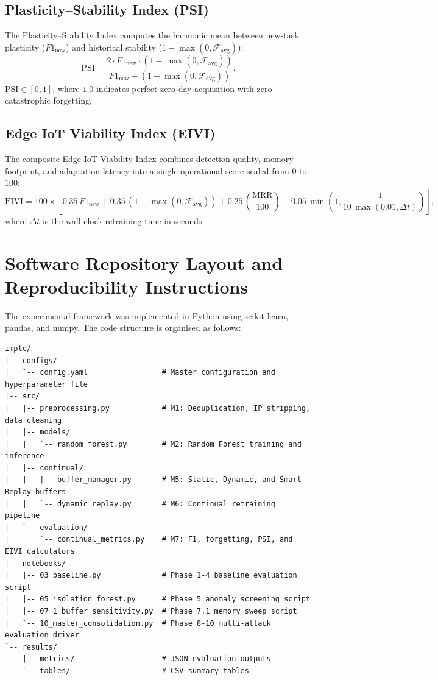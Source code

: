 \subsection{Plasticity--Stability Index (PSI)}
The Plasticity--Stability Index computes the harmonic mean between new-task plasticity ($F1_{\text{new}}$) and historical stability ($1 - \max(0, \mathcal{F}_{\text{avg}})$):
\begin{equation}
\text{PSI} = \frac{2 \cdot F1_{\text{new}} \cdot (1 - \max(0, \mathcal{F}_{\text{avg}}))}{F1_{\text{new}} + (1 - \max(0, \mathcal{F}_{\text{avg}}))}.
\end{equation}
$\text{PSI} \in [0, 1]$, where $1.0$ indicates perfect zero-day acquisition with zero catastrophic forgetting.

\subsection{Edge IoT Viability Index (EIVI)}
The composite Edge IoT Viability Index combines detection quality, memory footprint, and adaptation latency into a single operational score scaled from $0$ to $100$:
\begin{equation}
\text{EIVI} = 100 \times \left[ 0.35\,F1_{\text{new}} + 0.35\,(1 - \max(0, \mathcal{F}_{\text{avg}})) + 0.25\,\left(\frac{\text{MRR}}{100}\right) + 0.05\,\min\!\left(1, \frac{1}{10\,\max(0.01, \Delta t)}\right) \right],
\end{equation}
where $\Delta t$ is the wall-clock retraining time in seconds.

\section{Software Repository Layout and Reproducibility Instructions}
\label{app:code_structure}

The experimental framework was implemented in Python using scikit-learn, pandas, and numpy. The code structure is organised as follows:

\begin{verbatim}
imple/
|-- configs/
|   `-- config.yaml                 # Master configuration and hyperparameter file
|-- src/
|   |-- preprocessing.py            # M1: Deduplication, IP stripping, data cleaning
|   |-- models/
|   |   `-- random_forest.py        # M2: Random Forest training and inference
|   |-- continual/
|   |   |-- buffer_manager.py       # M5: Static, Dynamic, and Smart Replay buffers
|   |   `-- dynamic_replay.py       # M6: Continual retraining pipeline
|   `-- evaluation/
|       `-- continual_metrics.py    # M7: F1, forgetting, PSI, and EIVI calculators
|-- notebooks/
|   |-- 03_baseline.py              # Phase 1-4 baseline evaluation script
|   |-- 05_isolation_forest.py      # Phase 5 anomaly screening script
|   |-- 07_1_buffer_sensitivity.py  # Phase 7.1 memory sweep script
|   `-- 10_master_consolidation.py  # Phase 8-10 multi-attack evaluation driver
`-- results/
    |-- metrics/                    # JSON evaluation outputs
    `-- tables/                     # CSV summary tables
\end{verbatim}

